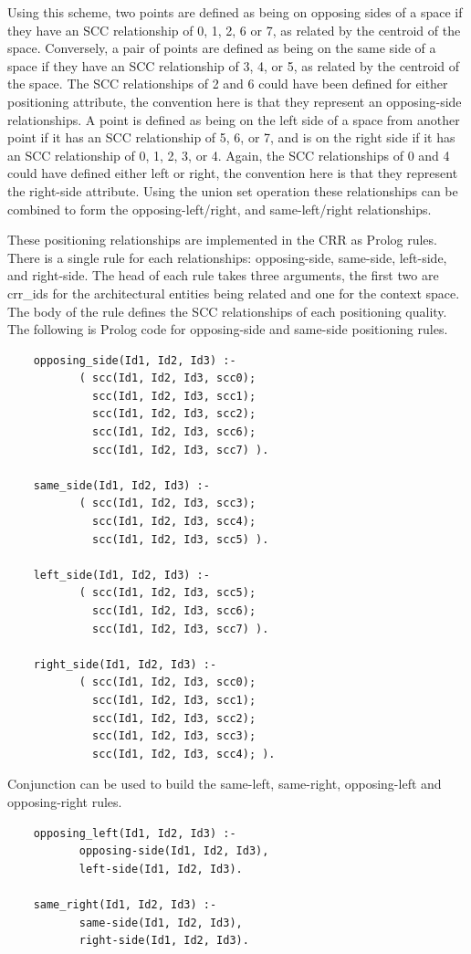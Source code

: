 \documentclass[12pt]{ucthesis}
\begin{document}
Using this scheme, two points are defined as being on opposing sides of a space if they have an SCC relationship of 0, 1, 2, 6 or 7, as related by the centroid of the space. Conversely, a pair of points are defined as being on the same side of a space if they have an SCC relationship of 3, 4, or 5, as related by the centroid of the  space. The SCC relationships of 2 and 6 could have been defined for either positioning attribute, the convention here is that they represent an opposing-side relationships. A point is defined as being on the left side of a space from another point if it has an SCC relationship of 5, 6, or 7, and is on the right side if it has an SCC relationship of 0, 1, 2, 3, or 4. Again, the SCC relationships of 0 and 4 could have defined either left or right, the convention here is that they represent the right-side attribute. Using the union set operation these relationships can be combined to form the opposing-left/right, and same-left/right relationships.

These positioning relationships are implemented in the CRR as Prolog rules. There is a single rule for each relationships: opposing-side, same-side, left-side, and right-side. The head of each rule takes three arguments, the first two are crr\_ids for the architectural entities being related and one for the context space. The body of the rule defines the SCC relationships of each positioning quality. The following is Prolog code for opposing-side and same-side positioning rules.
\begin{verbatim}
    opposing_side(Id1, Id2, Id3) :- 
           ( scc(Id1, Id2, Id3, scc0);
             scc(Id1, Id2, Id3, scc1);
             scc(Id1, Id2, Id3, scc2);
             scc(Id1, Id2, Id3, scc6);
             scc(Id1, Id2, Id3, scc7) ).
                                          
    same_side(Id1, Id2, Id3) :- 
           ( scc(Id1, Id2, Id3, scc3);
             scc(Id1, Id2, Id3, scc4);
             scc(Id1, Id2, Id3, scc5) ).
             
    left_side(Id1, Id2, Id3) :- 
           ( scc(Id1, Id2, Id3, scc5);
             scc(Id1, Id2, Id3, scc6);
             scc(Id1, Id2, Id3, scc7) ).
             
    right_side(Id1, Id2, Id3) :- 
           ( scc(Id1, Id2, Id3, scc0);
             scc(Id1, Id2, Id3, scc1);
             scc(Id1, Id2, Id3, scc2);
             scc(Id1, Id2, Id3, scc3);
             scc(Id1, Id2, Id3, scc4); ).                    
\end{verbatim} Conjunction can be used to build the same-left, same-right, opposing-left and opposing-right rules. 
\begin{verbatim}
    opposing_left(Id1, Id2, Id3) :- 
           opposing-side(Id1, Id2, Id3),
           left-side(Id1, Id2, Id3).

    same_right(Id1, Id2, Id3) :- 
           same-side(Id1, Id2, Id3),
           right-side(Id1, Id2, Id3).                                         
\end{verbatim}
\end{document}
